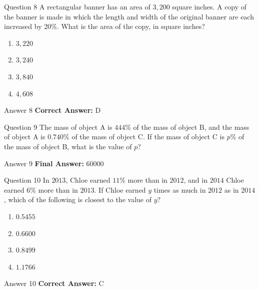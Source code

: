 \documentclass{beamer}
\begin{document}
\begin{frame}{Question 8}
\small
A rectangular banner has an area of \(3{,}200\) square inches. A copy of the banner is made in which the length and width of the original banner are each increased by \(20\%\). What is the area of the copy, in square inches?
\vspace{0.35cm}
\begin{enumerate}
    \item[A.] \(3{,}220\)
    \item[B.] \(3{,}240\)
    \item[C.] \(3{,}840\)
    \item[D.] \(4{,}608\)
\end{enumerate}
\end{frame}
\begin{frame}{Answer 8}
\small
\textbf{Correct Answer:} D
\end{frame}

\begin{frame}{Question 9}
\small
The mass of object A is \(444\%\) of the mass of object B, and the mass of object A is \(0.740\%\) of the mass of object C. If the mass of object C is \(p\%\) of the mass of object B, what is the value of \(p\)?
\end{frame}
\begin{frame}{Answer 9}
\small
\textbf{Final Answer:} $\boxed{60000}$
\end{frame}

\begin{frame}{Question 10}
\small
In \(2013\), Chloe earned \(11\%\) more than in \(2012\), and in \(2014\) Chloe earned \(6\%\) more than in \(2013\). If Chloe earned \(y\) times as much in \(2012\) as in \(2014\), which of the following is closest to the value of \(y\)?
\vspace{0.35cm}
\begin{enumerate}
    \item[A.] \(0.5455\)
    \item[B.] \(0.6600\)
    \item[C.] \(0.8499\)
    \item[D.] \(1.1766\)
\end{enumerate}
\end{frame}
\begin{frame}{Answer 10}
\small
\textbf{Correct Answer:} C
\end{frame}
\end{document}
